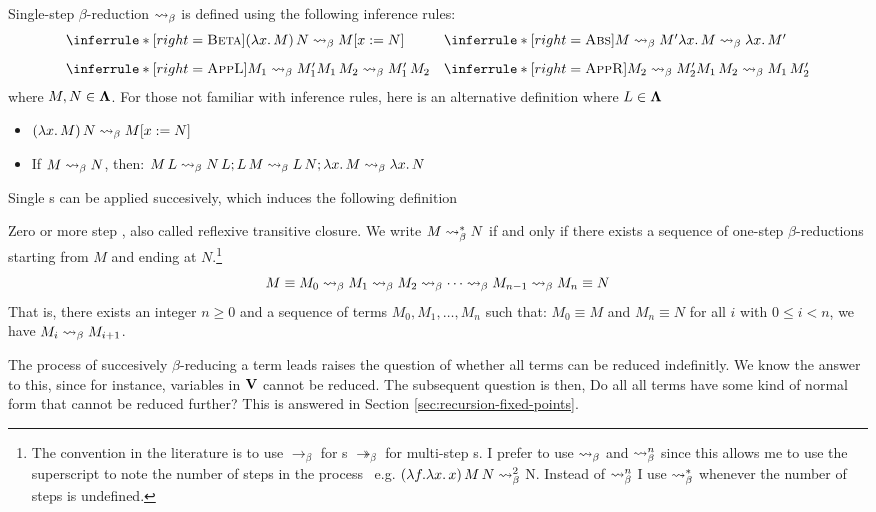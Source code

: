 \documentclass[12pt]{book}
\newcommand{\myref}[1]{\textcolor{refcolor}{\hyperref[#1]{\ref*{#1}}}}
\newcommand{\subst}[2]{[#1 := #2]}    %
\newcommand{\step}{\curly} %
\newcommand{\lam}[2]{\lambda #1.\,#2} %
\begin{document}
\begin{definition} Single-step $\beta$-reduction $\step$ is defined using the following inference rules:
\[
\begin{array}{@{}l@{\quad}l@{}}
  \inferrule*[right=\textsc{Beta}]
    { }
    { (\lam{x}{M})\,N \step M\subst{x}{N} }
  &
  \inferrule*[right=\textsc{Abs}]
    { M \step M' }
    { \lam{x}{M} \step \lam{x}{M'} } \\[2ex]
  \inferrule*[right=\textsc{AppL}]
    { M_1 \step M_1' }
    { M_1\,M_2 \step M_1'\,M_2 }
  &
  \inferrule*[right=\textsc{AppR}]
    { M_2 \step M_2' }
    { M_1\,M_2 \step M_1\,M_2' }
\end{array}
\]
where \( M, N \in \mathbf{\Lambda} \). For those not familiar with inference rules, here is an alternative definition where \( L \in \mathbf{\Lambda} \)
\begin{itemize}
\item \( (\lam{x}{M})\,N \step M\subst{x}{N} \)
\item If $M \step N$, then: \( M\,L \step N\,L; L\,M \step L\,N; \lam{x}{M} \step \lam{x}{N} \)
\end{itemize}
\end{definition} 
Single \bred s can be applied succesively, which induces the following definition
\begin{definition} Zero or more step \bred, also called reflexive transitive closure. We write $M \step^* N$ if and only if there exists a sequence of one-step $\beta$-reductions starting from $M$ and ending at $N$.\footnote{The convention in the literature is to use $\rightarrow_\beta$ for \bred s $\twoheadrightarrow_\beta$ for multi-step \bred s. I prefer to use $\mathrel{\leadsto}_\beta$ and $\mathrel{\leadsto}_\beta^n$ since this allows me to use the superscript to note the number of steps in the process \bred \ e.g. $ (\lambda f. \lambda x . \, x) \, M \, N \mathrel{\leadsto}_\beta^2 $ N. Instead of $\mathrel{\leadsto}_\beta^n$ I use $\mathrel{\leadsto}_\beta^*$ whenever the number of steps is undefined.}
  \label{def:zero-more-bred}
  \[
    M \equiv M_0 \step M_1 \step M_2 \step \cdots \step M_{n-1} \step M_n \equiv N
  \]
  That is, there exists an integer $n \geq 0$ and a sequence of terms $M_0, M_1, \dots, M_n$ such that: $ M_0 \equiv M $ and $ M_n \equiv N $ for all $ i $ with $ 0 \leq i < n $, we have $ M_i \step M_{i+1} $.
\end{definition}
The process of succesively $\beta$-reducing a term leads raises the question of whether all terms can be reduced indefinitly. We know the answer to this, since for instance, variables in $\mathbf{V}$ cannot be reduced. The subsequent question is then, Do all all terms have some kind of normal form that cannot be reduced further? This is answered in Section \myref{sec:recursion-fixed-points}.
\end{document}
